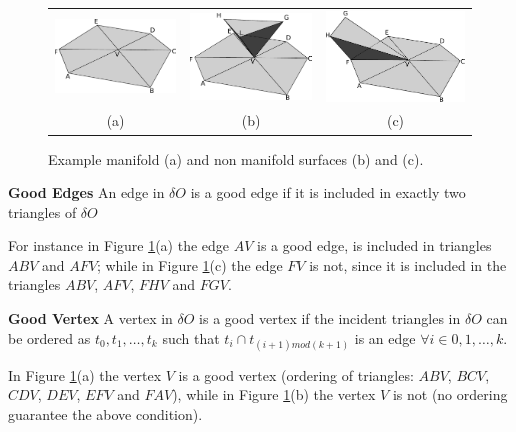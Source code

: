 \begin{figure}
 \begin{tabular}{ccc}
  \includegraphics[width=0.3\columnwidth]{./img/manifold}&
  \includegraphics[width=0.3\columnwidth]{./img/notmanifold1}&
  \includegraphics[width=0.3\columnwidth]{./img/notmanifold2}\\
  (a) & (b) & (c)
 \end{tabular}
 \caption{Example manifold (a) and non manifold surfaces (b) and (c).}
 \label{fig:manif}
 
\end{figure}



\begin{mydef}
\textbf{Good Edges}
An edge in $\delta O$ is a good edge if it is included in exactly two triangles of $\delta O$
\end{mydef}

For instance in Figure \ref{fig:manif}(a) the edge $AV$  is a good edge, is included in triangles $ABV$ and $AFV$; while in Figure \ref{fig:manif}(c) the edge $FV$ is not, since it is included in the triangles $ABV$, $AFV$, $FHV$ and $FGV$.

\begin{mydef}
\textbf{Good Vertex}
A vertex in $\delta O$  is a good vertex if the incident triangles in $\delta O$  can be ordered as
$t_0 , t_1, \dots, t_k$  such that $t_i \cap t_{(i+1) mod (k+1)}$ is an edge $\forall i \in {0, 1, \dots, k}$.
\end{mydef}

In Figure \ref{fig:manif}(a) the vertex $V$  is a good vertex (ordering of triangles: $ABV$, $BCV$, $CDV$, $DEV$, $EFV$ and $FAV$), while in Figure \ref{fig:manif}(b) the vertex $V$ is not (no ordering guarantee the above condition).

